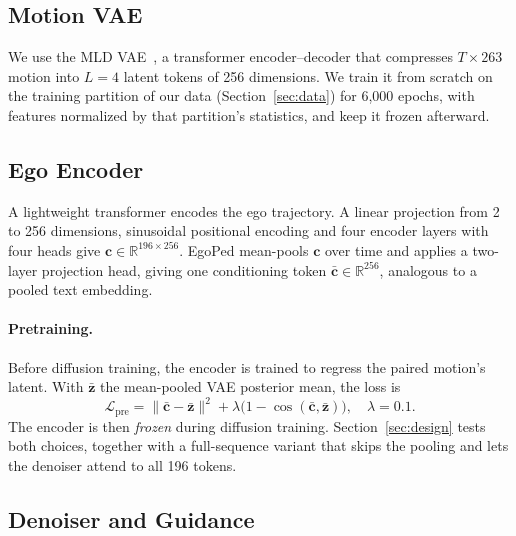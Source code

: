 \documentclass[letterpaper, 10 pt, conference]{ieeeconf}
\newcommand{\method}{EgoPed\xspace}
\begin{document}
\subsection{Motion VAE}

We use the MLD VAE~\cite{chen2023mld}, a transformer encoder--decoder that compresses $T \times 263$ motion into $L = 4$ latent tokens of 256 dimensions.
We train it from scratch on the training partition of our data (Section~\ref{sec:data}) for 6{,}000 epochs, with features normalized by that partition's statistics, and keep it frozen afterward.

\subsection{Ego Encoder}
\label{sec:egoencoder}

A lightweight transformer encodes the ego trajectory. A linear projection from 2 to 256 dimensions, sinusoidal positional encoding and four encoder layers with four heads give $\mathbf{c} \in \mathbb{R}^{196 \times 256}$.
\method mean-pools $\mathbf{c}$ over time and applies a two-layer projection head, giving one conditioning token $\bar{\mathbf{c}} \in \mathbb{R}^{256}$, analogous to a pooled text embedding.

\paragraph{Pretraining.}
Before diffusion training, the encoder is trained to regress the paired motion's latent. With $\bar{\mathbf{z}}$ the mean-pooled VAE posterior mean, the loss is
\begin{equation}
  \mathcal{L}_{\mathrm{pre}} = \|\bar{\mathbf{c}} - \bar{\mathbf{z}}\|^2 + \lambda\bigl(1 - \cos(\bar{\mathbf{c}}, \bar{\mathbf{z}})\bigr), \quad \lambda = 0.1 .
\end{equation}
The encoder is then \emph{frozen} during diffusion training.
Section~\ref{sec:design} tests both choices, together with a full-sequence variant that skips the pooling and lets the denoiser attend to all 196 tokens.

\subsection{Denoiser and Guidance}
\end{document}

